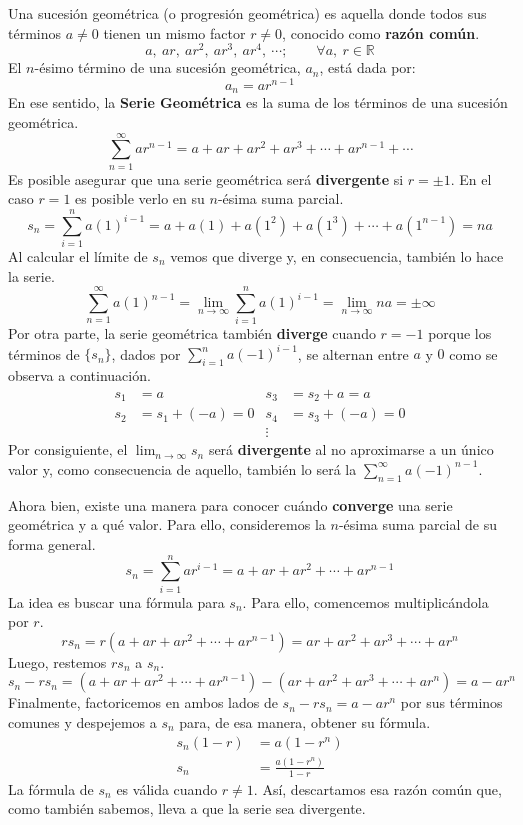 \documentclass[12pt]{article}
\begin{document}
Una sucesión geométrica (o progresión geométrica) es aquella donde todos sus términos $a \neq 0$ tienen un mismo factor $r \neq 0$, conocido como \textbf{razón común}.
\[
  a, \ ar, \ ar^{2}, \ ar^{3}, \ ar^{4}, \ \cdots; \qquad \forall a, \ r \in \mathbb{R}
\]
El $n$-ésimo término de una sucesión geométrica, $a_{n}$, está dada por:
\[
  a_{n} = a r^{n - 1}
\]
En ese sentido, la \textbf{Serie Geométrica} es la suma de los términos de una sucesión geométrica.
\[
  \sum_{n = 1}^{\infty} ar^{n - 1} = a + ar + ar^{2} + ar^{3} + \cdots + ar^{n - 1} + \cdots
\]
Es posible asegurar que una serie geométrica será \textbf{divergente} si $r = \pm 1$. En el caso $r = 1$ es posible verlo en su $n$-ésima suma parcial.
\[
  s_{n} = \sum_{i = 1}^{n} a (1)^{i - 1} = a + a(1) + a(1^{2}) + a(1^{3}) + \cdots + a(1^{n - 1}) = na
\]
Al calcular el límite de $s_{n}$ vemos que diverge y, en consecuencia, también lo hace la serie.
\[
  \sum_{n = 1}^{\infty} a (1)^{n - 1} = \lim_{n \to \infty} \sum_{i = 1}^{n} a (1)^{i - 1} = \lim_{n \to \infty} na = \pm \infty
\]
Por otra parte, la serie geométrica también \textbf{diverge} cuando $r = -1$ porque los términos de $\{s_{n}\}$, dados por $\sum_{i = 1}^{n} a (-1)^{i - 1}$, se alternan entre $a$ y $0$ como se observa a continuación.
\begin{align*}
s_{1} &= a & s_{3} &= s_{2} + a = a \\
s_{2} &= s_{1} + (-a) = 0 & s_{4} &= s_{3} + (-a) = 0 \\
& &\vdots
\end{align*}
Por consiguiente, el $\lim_{n \to \infty} s_{n}$ será \textbf{divergente} al no aproximarse a un único valor y, como consecuencia de aquello, también lo será la $\sum_{n = 1}^{\infty} a (-1)^{n - 1}$.

Ahora bien, existe una manera para conocer cuándo \textbf{converge} una serie geométrica y a qué valor. Para ello, consideremos la $n$-ésima suma parcial de su forma general.
\[
  s_{n} = \sum_{i = 1}^{n} ar^{i - 1} = a + ar + ar^{2} + \cdots + ar^{n - 1}
\]
La idea es buscar una fórmula para $s_{n}$. Para ello, comencemos multiplicándola por $r$.
\[
  rs_{n} = r(a + ar + ar^{2} + \cdots + ar^{n - 1}) = ar + ar^{2} + ar^{3} + \cdots + ar^{n}
\]
Luego, restemos $rs_{n}$ a $s_{n}$.
\[
  s_{n} - rs_{n} = (a + ar + ar^{2} + \cdots + ar^{n - 1}) - (ar + ar^{2} + ar^{3} + \cdots + ar^{n}) = a - ar^{n}
\]
Finalmente, factoricemos en ambos lados de $s_{n} - rs_{n} = a - ar^{n}$ por sus términos comunes y despejemos a $s_{n}$ para, de esa manera, obtener su fórmula.
\begin{align*}
  s_{n} (1 - r) &= a (1 - r^{n}) \\
          s_{n} &= \frac{a (1 - r^{n})}{1 - r}
\end{align*}
La fórmula de $s_{n}$ es válida cuando $r \neq 1$. Así, descartamos esa razón común que, como también sabemos, lleva a que la serie sea divergente.
\end{document}
